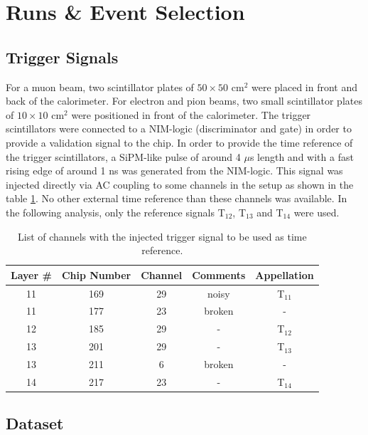 \section{Runs \& Event Selection}
\label{sec:EvtSelection}

\subsection{Trigger Signals}
\label{subsec:trigger}

For a muon beam, two scintillator plates of $50\times50$ cm$^2$ were placed in front and back of the calorimeter. For electron and pion beams, two small scintillator plates of $10\times10$ cm$^2$ were positioned in front of the calorimeter. The trigger scintillators were connected to a NIM-logic (discriminator and gate) in order to provide a validation signal to the chip.
In order to provide the time reference of the trigger scintillators, a SiPM-like pulse of around 4 $\mu$s length and with a fast rising edge of around 1 ns was generated from the NIM-logic. This signal was injected directly via AC coupling to some channels in the setup as shown in the table \ref{table:trigger_signal_list}. No other external time reference than these channels was available. In the following analysis, only the reference signals T$_{12}$,  T$_{13}$ and T$_{14}$ were used.

\begin{table}[htb!]
	\centering
	\caption{List of channels with the injected trigger signal to be used as time reference.}
	\label{table:trigger_signal_list}
	\begin{tabular}{@{} ccccc @{}}
		\hline
		Layer \# & Chip Number & Channel & Comments & Appellation \\
		\hline
		11 & 169 & 29 & noisy & T$_{11}$ \\
		11 & 177 & 23 & broken & - \\
		12 & 185 & 29 & - & T$_{12}$ \\
		13 & 201 & 29 & -  & T$_{13}$ \\
		13 & 211 & 6 & broken & - \\
		14 & 217 & 23 & - & T$_{14}$ \\
		\hline
	\end{tabular}
\end{table}

\subsection{Dataset}
\label{subsec:dataset}

